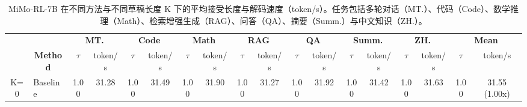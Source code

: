 \documentclass{article} %
\begin{document}
\begin{table}[ht]
\centering
\caption{MiMo-RL-7B 在不同方法与不同草稿长度 K 下的平均接受长度与解码速度（token/s）。任务包括多轮对话（MT.）、代码（Code）、数学推理（Math）、检索增强生成（RAG）、问答（QA）、摘要（Summ.）与中文知识（ZH.）。}
\small
\begin{adjustbox}{width=\textwidth}
\label{tab:all}
\begin{tabular}{clcccccccccccccccc}
\toprule
                                  & \multicolumn{1}{c}{}                          & \multicolumn{2}{c}{\textbf{MT.}}                                               & \multicolumn{2}{c}{\textbf{Code}}                                              & \multicolumn{2}{c}{\textbf{Math}}                                              & \multicolumn{2}{c}{\textbf{RAG}}                                               & \multicolumn{2}{c}{\textbf{QA}}                                                & \multicolumn{2}{c}{\textbf{Summ.}}                                             & \multicolumn{2}{c}{\textbf{ZH.}}                                               & \multicolumn{2}{c}{\textbf{Mean}}                                                      \\ \cmidrule{3-18}
\multirow{-2}{*}{} & \multicolumn{1}{c}{\multirow{-2}{*}{\textbf{Method}}}  & $\tau$                            & token/s                                & $\tau$                            & token/s                                & $\tau$                            & token/s                                & $\tau$                            & token/s                                & $\tau$                            & token/s                                & $\tau$                            & token/s                                & $\tau$                            & token/s                                & $\tau$                            & token/s                              \\ \midrule
K=0                               & Baseline                                      & 1.00                         & 31.28                                  & 1.00                         & 31.49                                  & 1.00                         & 31.90                                  & 1.00                         & 31.27                                  & 1.00                         & 31.92                                  & 1.00                         & 31.42                                  & 1.00                         & 31.63                                  & 1.00                         & 31.55 (1.00x)                                  \\ \midrule

\end{tabular}
\end{adjustbox}
\end{table}
\end{document}
